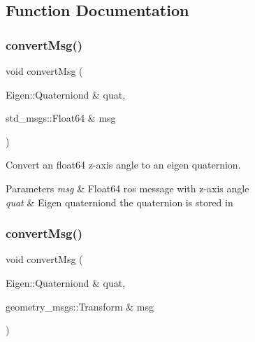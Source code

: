 \subsection{Function Documentation}
\mbox{\label{group__multi__robot__controller_ga465b07e16106af072ed5315010fa876c}} 
\subsubsection{\texorpdfstring{convert\+Msg()}{convertMsg()}\hspace{0.1cm}{\footnotesize\ttfamily [1/14]}}
{\footnotesize\ttfamily void convert\+Msg (\begin{DoxyParamCaption}\item[{Eigen\+::\+Quaterniond \&}]{quat,  }\item[{std\+\_\+msgs\+::\+Float64 \&}]{msg }\end{DoxyParamCaption})\hspace{0.3cm}{\ttfamily [inline]}}



Convert an float64 z-\/axis angle to an eigen quaternion. 


\begin{DoxyParams}{Parameters}
{\em msg} & Float64 ros message with z-\/axis angle \\
\hline
{\em quat} & Eigen quaterniond the quaternion is stored in \\
\hline
\end{DoxyParams}
\mbox{\label{group__multi__robot__controller_gad42169e0be94216cd31a8a360a848155}} 
\subsubsection{\texorpdfstring{convert\+Msg()}{convertMsg()}\hspace{0.1cm}{\footnotesize\ttfamily [2/14]}}
{\footnotesize\ttfamily void convert\+Msg (\begin{DoxyParamCaption}\item[{Eigen\+::\+Quaterniond \&}]{quat,  }\item[{geometry\+\_\+msgs\+::\+Transform \&}]{msg }\end{DoxyParamCaption})\hspace{0.3cm}{\ttfamily [inline]}}



